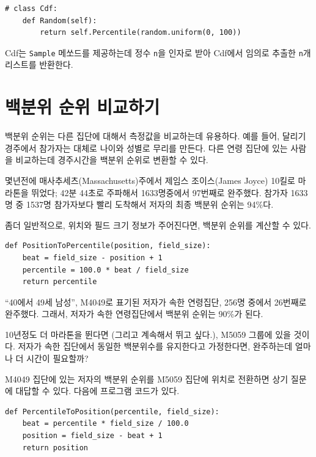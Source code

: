\begin{verbatim}
# class Cdf:
    def Random(self):
        return self.Percentile(random.uniform(0, 100))
\end{verbatim}

Cdf는 {\tt Sample} 메쏘드를 제공하는데 정수 {\tt n}을
인자로 받아 Cdf에서 임의로 추출한 {\tt n}개 리스트를 반환한다.


\section{백분위 순위 비교하기}

백분위 순위는 다른 집단에 대해서 측정값을 비교하는데 유용하다.
예를 들어, 달리기 경주에서 참가자는 대체로 나이와 성별로 무리를 만든다.
다른 연령 집단에 있는 사람을 비교하는데 경주시간을 백분위 순위로 변환할 수 있다.


몇년전에 매사추세츠(Massachusetts)주에서 제임스 조이스(James Joyce) 10킬로 마라톤을 뛰었다;
42분 44초로 주파해서 1633명중에서 97번째로 완주했다. 참가자 1633명 중 1537명 참가자보다 빨리 도착해서 
저자의 최종 백분위 순위는 94\%다.  


좀더 일반적으로, 위치와 필드 크기 정보가 주어진다면, 백분위 순위를 계산할 수 있다.

\begin{verbatim}
def PositionToPercentile(position, field_size):
    beat = field_size - position + 1
    percentile = 100.0 * beat / field_size
    return percentile
\end{verbatim}

``40에서 49세 남성'', M4049로 표기된 저자가 속한 연령집단, 256명 중에서 26번째로 완주했다.
그래서, 저자가 속한 연령집단에서 백분위 순위는 90\%가 된다.

10년정도 더 마라톤을 뛴다면 (그리고 계속해서 뛰고 싶다.), M5059 그룹에 있을 것이다.
저자가 속한 집단에서 동일한 백분위수를 유지한다고 가정한다면, 완주하는데 얼마나 더 시간이 필요할까?

M4049 집단에 있는 저자의 백분위 순위를 M5059 집단에 위치로 전환하면 상기 질문에 대답할 수 있다.
다음에 프로그램 코드가 있다.

\begin{verbatim}
def PercentileToPosition(percentile, field_size):
    beat = percentile * field_size / 100.0
    position = field_size - beat + 1
    return position
\end{verbatim}

